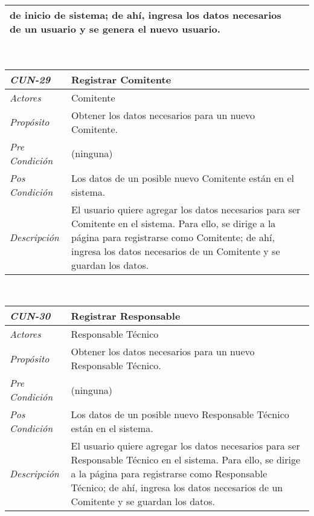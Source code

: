 \begin{center}
{\begin{tabular}{ | p{3cm} | p{12.5cm} | }
	de inicio de sistema; de ah\'i, ingresa los datos
	necesarios de un usuario y se genera el nuevo
	usuario. \\
	\hline
\end{tabular}} \\[1cm]
\hypertarget{CUN-29}{%
\begin{tabular}{ | p{3cm} | p{12.5cm} | }
	\hline
	\rowcolor{lightgray}
	\hfil \textbf{\textit{CUN-29}} &
	\hfil \textbf{Registrar Comitente} \\
	\hline
	\raggedleft \textit{Actores} & Comitente \\
	\hline
	\raggedleft \textit{Prop\'osito} & Obtener los
	datos necesarios para un nuevo Comitente. \\
	\hline
	\raggedleft \textit{Pre Condici\'on} & (ninguna) \\
	\hline
	\raggedleft \textit{Pos Condici\'on} & Los datos de
	un posible nuevo Comitente est\'an en el sistema. \\
	\hline
	\raggedleft \textit{Descripci\'on} &
	El usuario quiere agregar los datos necesarios para
	ser Comitente en el sistema. Para ello, se dirige a la
	p\'agina para registrarse como Comitente; de ah\'i,
	ingresa los datos necesarios de un Comitente y se
	guardan los datos. \\
	\hline
\end{tabular}} \\[1cm]
\hypertarget{CUN-30}{%
\begin{tabular}{ | p{3cm} | p{12.5cm} | }
	\hline
	\rowcolor{lightgray}
	\hfil \textbf{\textit{CUN-30}} &
	\hfil \textbf{Registrar Responsable} \\
	\hline
	\raggedleft \textit{Actores} & Responsable
	T\'ecnico \\
	\hline
	\raggedleft \textit{Prop\'osito} & Obtener los
	datos necesarios para un nuevo Responsable
	T\'ecnico. \\
	\hline
	\raggedleft \textit{Pre Condici\'on} & (ninguna) \\
	\hline
	\raggedleft \textit{Pos Condici\'on} & Los datos de
	un posible nuevo Responsable T\'ecnico est\'an en el
	sistema. \\
	\hline
	\raggedleft \textit{Descripci\'on} &
	El usuario quiere agregar los datos necesarios para
	ser Responsable T\'ecnico en el sistema. Para ello,
	se dirige a la p\'agina para registrarse como
	Responsable T\'ecnico; de ah\'i, ingresa los datos
	necesarios de un Comitente y se guardan los datos. \\
	\hline
\end{tabular}} \\[1cm]

\end{center}
